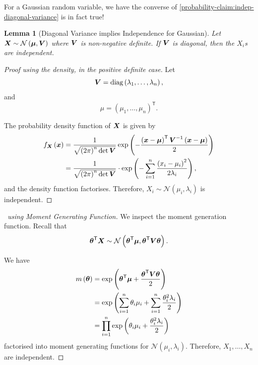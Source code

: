 \documentclass[11pt]{article}
\numberwithin{equation}{section}
\newtheorem{lemma}[theorem]{Lemma}
\theoremstyle{definition}
\theoremstyle{remark}
\newcommand{\pqty}[1]{\left(#1\right)}
\newcommand{\inverse}{^{-1}}
\newcommand{\transpose}{^{\mathsf T}}
\DeclareMathOperator{\diag}{diag}
\newcommand{\Normal}{\mathcal N}
\begin{document}
For a Gaussian random variable, we have the converse of \autoref{probability-claim:indep-diagonal-variance} is in fact true!

\begin{lemma}[Diagonal Variance implies Independence for Gaussian]\label{probability-lemma-012}
    \label{probability-lem:diagonal-variance-independence-gaussian}%
    Let \(\vb{X} \sim \Normal\pqty{\vb*{\mu}, \vb{V}}\) where \(\vb{V}\) is non-negative definite. If \(\vb{V}\) is diagonal, then the \(X_i\)s are independent.
\end{lemma}

\begin{proof}[Proof using the density, in the positive definite case]\label{probability-proof-085}
    Let
    \[
        \vb{V} = \diag\pqty{\lambda_1, \ldots, \lambda_n},
    \]
    and
    \[
        \mu = \pqty{\mu_1, \ldots, \mu_n}\transpose.
    \]

    The probability density function of \(\vb{X}\) is given by
    \begin{align*}
        f_{\vb{X}} \pqty{\vb{x}} &= \frac{1}{\sqrt{\pqty{2 \pi}^n \det \vb{V}}} \exp \pqty{- \frac{\pqty{\vb{x} - \vb*{\mu}} \transpose \vb{V}\inverse \pqty{\vb{x} - \vb*{\mu}}}{2}} \\
        &= \frac{1}{\sqrt{\pqty{2\pi}^n \det \vb{V}}} \cdot \exp\pqty{- \sum_{i = 1}^{n} \frac{\pqty{x_i - \mu_i}^2}{2 \lambda_i}},
    \end{align*}
    and the density function factorises. Therefore, \(X_i \sim \Normal\pqty{\mu_i, \lambda_i}\) is independent.
\end{proof}

\begin{proof}[\proofname\ using Moment Generating Function]\label{probability-proof-086}
    We inspect the moment generation function. Recall that
    \[
        \vb*{\theta}\transpose \vb{X} \sim \Normal\pqty{\vb*{\theta}\transpose \vb*{\mu}, \vb*{\theta}\transpose \vb{V} \vb*{\theta}}.
    \]
    
    We have
    \begin{align*}
        m\pqty{\vb*{\theta}} &= \exp\pqty{\vb*{\theta}\transpose \vb*{\mu} + \frac{\vb*{\theta}\transpose \vb{V} \vb*{\theta}}{2}} \\
        &= \exp\pqty{\sum_{i = 1}^{n} \theta_i \mu_i + \sum_{i = 1}^{n} \frac{\theta_i^2 \lambda_i}{2}} \\
        &= \prod_{i = 1}^{n} \exp\pqty{\theta_i \mu_i + \frac{\theta_i^2 \lambda_i}{2}}
    \end{align*}
    factorised into moment generating functions for \(\Normal\pqty{\mu_i, \lambda_i}\). Therefore, \(X_1, \ldots, X_n\) are independent.
\end{proof}
\end{document}
